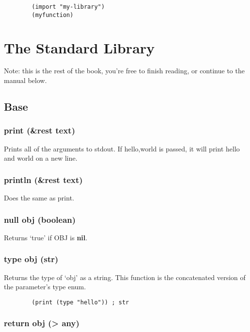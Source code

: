 \documentclass{article}
\begin{document}
	\begin{lstlisting}
		(import "my-library")
		(myfunction)
	\end{lstlisting}

	\newpage
	\section{The Standard Library}
	
	Note: this is the rest of the book, you're free to finish reading, or continue to the manual below.
	
	\subsection{Base}
	
	\subsubsection{print (\&rest text)}

	Prints all of the arguments to stdout. If {hello,world} is passed, it will print hello and world on a new line.
	
	\subsubsection{println (\&rest text)}
	
	Does the same as print.
	
	\subsubsection{null obj (boolean)}
	
	Returns `true' if OBJ is \textbf{nil}.
	
	\subsubsection{type obj (str)}
	
	Returns the type of `obj' as a string. This function is the concatenated version of the parameter's type enum.
	
	\begin{lstlisting}
		(print (type "hello")) ; str
	\end{lstlisting}

	\subsubsection{return obj (> any)}
	
\end{document}
